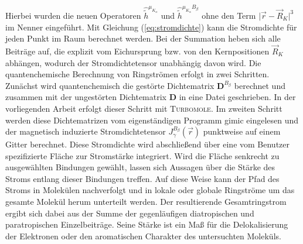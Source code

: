 	Hierbei wurden die neuen Operatoren $\hat{\tilde{h}}^{\mu_{K_\alpha}}$ und $\hat{\tilde{h}}^{\mu_{K_\alpha}B_\beta}$ ohne den Term $\vert\vec{r}-\vec{R}_K\vert^3$ im Nenner eingeführt. Mit Gleichung (\ref{eq:stromdichte}) kann die Stromdichte für jeden Punkt im Raum berechnet werden. Bei der Summation heben sich alle Beiträge auf, die explizit vom Eichursprung bzw. von den Kernpositionen $\vec{R}_K$ abhängen, wodurch der Stromdichtetensor unabhängig davon wird. 
Die quantenchemische Berechnung von Ringströmen erfolgt in zwei Schritten. Zunächst wird quantenchemisch die gestörte Dichtematrix $\boldsymbol{D}^{B_\beta}$ berechnet und zusammen mit der ungestörten Dichtematrix $\boldsymbol D$ in eine Datei geschrieben. In der vorliegenden Arbeit erfolgt dieser Schritt mit \textsc{Turbomole}. Im zweiten Schritt werden diese Dichtematrizen vom eigenständigen Programm \ac{gimic} eingelesen und der magnetisch induzierte Stromdichtetensor $J^{B_\beta}_\gamma(\vec{r})$ punktweise auf einem Gitter berechnet. Diese Stromdichte wird abschließend über eine vom Benutzer spezifizierte Fläche zur Stromstärke integriert. Wird die Fläche senkrecht zu ausgewählten Bindungen gewählt, lassen sich Aussagen über die Stärke des Stroms entlang dieser Bindungen treffen. Auf diese Weise kann der Pfad des Stroms in Molekülen nachverfolgt und in lokale oder globale Ringströme um das gesamte Molekül herum unterteilt werden. Der resultierende Gesamtringstrom ergibt sich dabei aus der Summe der gegenläufigen diatropischen und paratropischen Einzelbeiträge. Seine Stärke ist ein Maß für die Delokalisierung der Elektronen oder den aromatischen Charakter des untersuchten Moleküls.
\newpage
\thispagestyle{empty}
\cleardoublepage

 